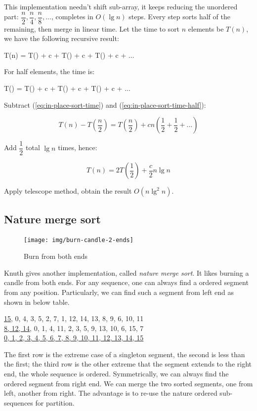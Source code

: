 \documentclass[b5paper]{article}
\begin{document}
This implementation needn't shift sub-array, it keeps reducing the unordered part: $\dfrac{n}{2}, \dfrac{n}{4}, \dfrac{n}{8}, ...$, completes in $O(\lg n)$ steps. Every step sorts half of the remaining, then merge in linear time. Let the time to sort $n$ elements be $T(n)$, we have the following recursive result:

\be
T(n) = T() + c  + T() + c  + T() + c  + ...
\label{eq:in-place-sort-time}
\ee

For half elements, the time is:

\be
T() = T() + c  + T() + c  + T() + c  + ...
\label{eq:in-place-sort-time-half}
\ee

Subtract (\cref{eq:in-place-sort-time}) and (\cref{eq:in-place-sort-time-half}):

\[
T(n) - T(\frac{n}{2}) = T(\frac{n}{2}) + c n (\frac{1}{2} + \frac{1}{2} + ... )
\]

Add $\dfrac{1}{2}$ total $\lg n$ times, hence:

\[
T(n) = 2 T(\frac{1}{2}) + \frac{c}{2} n \lg n
\]

Apply telescope method, obtain the result $O(n \lg^2 n)$.

\subsection{Nature merge sort}

\begin{figure}[htbp]
 \centering
 \texttt{[image: img/burn-candle-2-ends]}
 \caption{Burn from both ends}
 \label{fig:burn-candle}
\end{figure}

Knuth gives another implementation, called {\em nature merge sort}. It likes burning a candle from both ends\cite{TAOCP}. For any sequence, one can always find a ordered segment from any position. Particularly, we can find such a segment from left end as shown in below table.

\underline{15}, 0, 4, 3, 5, 2, 7, 1, 12, 14, 13, 8, 9, 6, 10, 11 \\
\underline{8, 12, 14}, 0, 1, 4, 11, 2, 3, 5, 9, 13, 10, 6, 15, 7 \\
\underline{0, 1, 2, 3, 4, 5, 6, 7, 8, 9, 10, 11, 12, 13, 14, 15 } \\
\etab

The first row is the extreme case of a singleton segment, the second is less than the first; the third row is the other extreme that the segment extends to the right end, the whole sequence is ordered. Symmetrically, we can always find the ordered segment from right end. We can merge the two sorted segments, one from left, another from right. The advantage is to re-use the nature ordered sub-sequences for partition.
\end{document}
